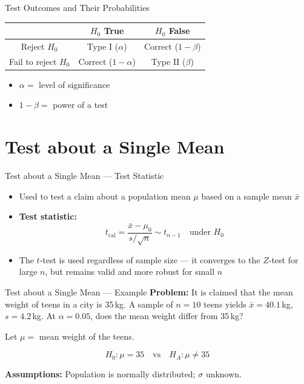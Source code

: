 \documentclass[12pt, aspectratio=169]{beamer}
\begin{document}
    \begin{frame}{Test Outcomes and Their Probabilities}
        \begin{center}
            \begin{tabular}{c|cc}
                \hline
                & $H_0$ True & $H_0$ False \\
                \hline
                Reject $H_0$ & Type I ($\alpha$) & Correct ($1-\beta$) \\
                Fail to reject $H_0$ & Correct ($1-\alpha$) & Type II ($\beta$) \\
                \hline
            \end{tabular}
        \end{center}

        \begin{itemize}
            \item \(\alpha = \) level of significance
            \item \(1 - \beta = \) power of a test
        \end{itemize}
    \end{frame}


    \section{Test about a Single Mean}


    \begin{frame}{Test about a Single Mean --- Test Statistic}
        \begin{itemize}
            \item Used to test a claim about a population mean $\mu$ based on a sample mean $\bar{x}$
            \item \textbf{Test statistic:}
            \[
                t_{\text{cal}} = \frac{\bar{x} - \mu_0}{s/\sqrt{n}} \sim t_{n-1} \quad \text{under } H_0
            \]
            \item The $t$-test is used regardless of sample size --- it converges to the $Z$-test for large $n$, but remains valid and more robust for small $n$
        \end{itemize}
    \end{frame}


    \begin{frame}{Test about a Single Mean --- Example}
        \textbf{Problem:} It is claimed that the mean weight of teens in a city
        is 35\,kg. A sample of $n = 10$ teens yields $\bar{x} = 40.1$\,kg,
        $s = 4.2$\,kg. At $\alpha = 0.05$, does the mean weight differ from 35\,kg?

        \vspace{0.8em}

        Let $\mu = $ mean weight of the teens.

        \[
            H_0: \mu = 35 \quad \text{vs} \quad H_A: \mu \neq 35
        \]

        \vspace{0.5em}

        \textbf{Assumptions:} Population is normally distributed; $\sigma$ unknown.
    \end{frame}
\end{document}
